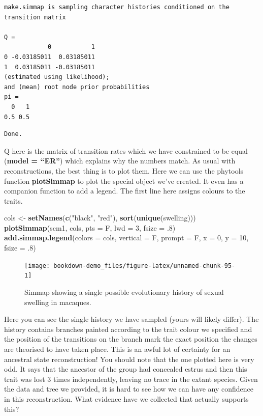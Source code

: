 \documentclass[
]{book}
\newenvironment{Shaded}{\begin{snugshade}}{\end{snugshade}}
\newcommand{\DataTypeTok}[1]{\textcolor[rgb]{0.13,0.29,0.53}{#1}}
\newcommand{\DecValTok}[1]{\textcolor[rgb]{0.00,0.00,0.81}{#1}}
\newcommand{\FloatTok}[1]{\textcolor[rgb]{0.00,0.00,0.81}{#1}}
\newcommand{\KeywordTok}[1]{\textcolor[rgb]{0.13,0.29,0.53}{\textbf{#1}}}
\newcommand{\NormalTok}[1]{#1}
\newcommand{\StringTok}[1]{\textcolor[rgb]{0.31,0.60,0.02}{#1}}
\begin{document}
\begin{verbatim}
make.simmap is sampling character histories conditioned on the transition matrix

Q =
            0           1
0 -0.03185011  0.03185011
1  0.03185011 -0.03185011
(estimated using likelihood);
and (mean) root node prior probabilities
pi =
  0   1 
0.5 0.5 
\end{verbatim}

\begin{verbatim}
Done.
\end{verbatim}

Q here is the matrix of transition rates which we have constrained to be equal (\textbf{model = ``ER''}) which explains why the numbers match. As usual with reconstructions, the best thing is to plot them. Here we can use the phytools function \textbf{plotSimmap} to plot the special object we've created. It even has a companion function to add a legend. The first line here assigns colours to the traits.

\begin{Shaded}
\begin{Highlighting}[]
\NormalTok{cols \textless{}{-}}\StringTok{ }\KeywordTok{setNames}\NormalTok{(}\KeywordTok{c}\NormalTok{(}\StringTok{"black"}\NormalTok{, }\StringTok{"red"}\NormalTok{), }\KeywordTok{sort}\NormalTok{(}\KeywordTok{unique}\NormalTok{(swelling)))}
\KeywordTok{plotSimmap}\NormalTok{(scm1, cols, }\DataTypeTok{pts =}\NormalTok{ F, }\DataTypeTok{lwd =} \DecValTok{3}\NormalTok{, }\DataTypeTok{fsize =} \FloatTok{.8}\NormalTok{)}
\KeywordTok{add.simmap.legend}\NormalTok{(}\DataTypeTok{colors =}\NormalTok{ cols, }\DataTypeTok{vertical =}\NormalTok{ F, }\DataTypeTok{prompt =}\NormalTok{ F, }\DataTypeTok{x =} \DecValTok{0}\NormalTok{, }\DataTypeTok{y =} \DecValTok{10}\NormalTok{, }\DataTypeTok{fsize =} \FloatTok{.8}\NormalTok{)}
\end{Highlighting}
\end{Shaded}

\begin{figure}[H]

{\centering \texttt{[image: bookdown-demo\_files/figure-latex/unnamed-chunk-95-1]} 

}

\caption{Simmap showing a single possible evolutionary history of sexual swelling in macaques.}\label{fig:unnamed-chunk-95}
\end{figure}

Here you can see the single history we have sampled (yours will likely differ). The history contains branches painted according to the trait colour we specified and the position of the transitions on the branch mark the exact position the changes are theorised to have taken place. This is an awful lot of certainty for an ancestral state reconstruction! You should note that the one plotted here is very odd. It says that the ancestor of the group had concealed estrus and then this trait was lost 3 times independently, leaving no trace in the extant species. Given the data and tree we provided, it is hard to see how we can have any confidence in this reconstruction. What evidence have we collected that actually supports this?
\end{document}
